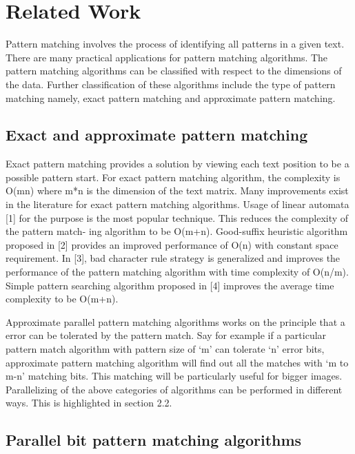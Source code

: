 \documentclass[graybox]{svmult}
\begin{document}
\section{Related Work}
\label{sec:2}
Pattern matching involves the process of identifying all patterns in a given text. There are many practical applications for pattern matching algorithms. The pattern matching algorithms can be classified with respect to the dimensions of the data. Further classification of these algorithms include the type of pattern matching namely, exact pattern
matching and approximate pattern matching.

\subsection{Exact and approximate pattern matching}
\label{subsec:2}
Exact pattern matching provides a solution by viewing each text position to be a possible pattern start. For exact pattern matching algorithm, the complexity is O(mn) where m*n is the dimension of the text matrix. Many improvements exist in the literature for exact pattern matching algorithms. Usage of linear automata [1] for the purpose is the most popular technique. This reduces the complexity of the pattern match-
ing algorithm to be O(m+n). Good-suffix heuristic algorithm proposed in [2] provides an improved performance of O(n) with constant space requirement. In [3], bad character rule strategy is generalized and improves the performance of the pattern matching algorithm with time complexity of O(n/m). Simple pattern searching algorithm proposed in [4] improves the average time complexity to be O(m+n).

Approximate parallel pattern matching algorithms works on the principle that a error can be tolerated by the pattern match. Say for example if a particular pattern match algorithm with pattern size of ‘m’ can tolerate ‘n’ error bits, approximate pattern matching algorithm will find out all the matches with ‘m to m-n’ matching bits. This matching will be particularly useful for bigger images. Parallelizing of the above categories of algorithms can be performed in different ways. This is highlighted in section 2.2.

\subsection{Parallel bit pattern matching algorithms}
\label{subsec:2}
\end{document}
